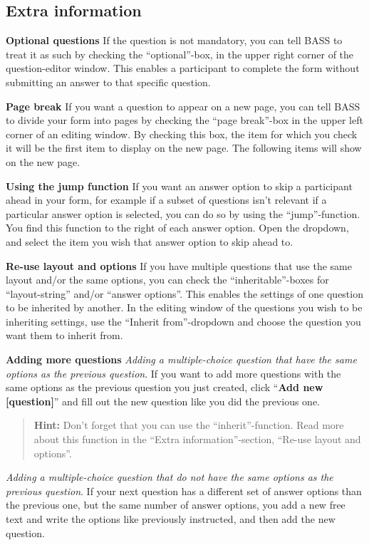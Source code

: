 \documentclass[
]{book}
\begin{document}
\subsection{Extra information}\label{extra-information}

\textbf{Optional questions}
If the question is not mandatory, you can tell BASS to treat it as such by checking the ``optional''-box, in the upper right corner of the question-editor window. This enables a participant to complete the form without submitting an answer to that specific question.

\textbf{Page break}
If you want a question to appear on a new page, you can tell BASS to divide your form into pages by checking the ``page break''-box in the upper left corner of an editing window. By checking this box, the item for which you check it will be the first item to display on the new page. The following items will show on the new page.

\textbf{Using the jump function}
If you want an answer option to skip a participant ahead in your form, for example if a subset of questions isn't relevant if a particular answer option is selected, you can do so by using the ``jump''-function. You find this function to the right of each answer option. Open the dropdown, and select the item you wish that answer option to skip ahead to.

\textbf{Re-use layout and options}
If you have multiple questions that use the same layout and/or the same options, you can check the ``inheritable''-boxes for ``layout-string'' and/or ``answer options''. This enables the settings of one question to be inherited by another. In the editing window of the questions you wish to be inheriting settings, use the ``Inherit from''-dropdown and choose the question you want them to inherit from.

\textbf{Adding more questions}
\emph{Adding a multiple-choice question that have the same options as the previous question}.
If you want to add more questions with the same options as the previous question you just created, click ``\textbf{Add new {[}question{]}}'' and fill out the new question like you did the previous one.

\begin{quote}
\textbf{Hint:} Don't forget that you can use the ``inherit''-function. Read more about this function in the ``Extra information''-section, ``Re-use layout and options''.
\end{quote}

\emph{Adding a multiple-choice question that do not have the same options as the previous question}.
If your next question has a different set of answer options than the previous one, but the same number of answer options, you add a new free text and write the options like previously instructed, and then add the new question.
\end{document}
